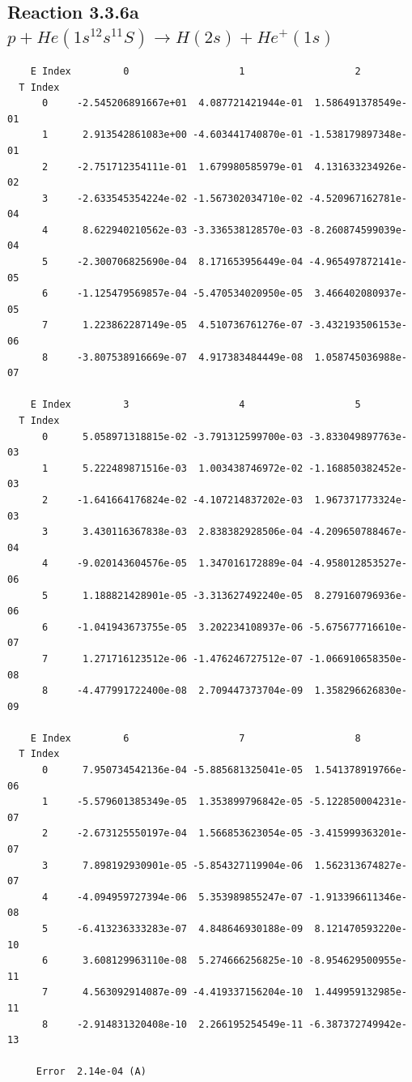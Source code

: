\documentclass[12pt,dvipdfmx]{article}
\begin{document}
\newpage
\subsection{
Reaction 3.3.6a $  p + He(1s^12s^11S) \rightarrow H(2s) + He^+(1s)$}


\begin{small}\begin{verbatim}
    E Index         0                   1                   2
  T Index
      0     -2.545206891667e+01  4.087721421944e-01  1.586491378549e-01
      1      2.913542861083e+00 -4.603441740870e-01 -1.538179897348e-01
      2     -2.751712354111e-01  1.679980585979e-01  4.131633234926e-02
      3     -2.633545354224e-02 -1.567302034710e-02 -4.520967162781e-04
      4      8.622940210562e-03 -3.336538128570e-03 -8.260874599039e-04
      5     -2.300706825690e-04  8.171653956449e-04 -4.965497872141e-05
      6     -1.125479569857e-04 -5.470534020950e-05  3.466402080937e-05
      7      1.223862287149e-05  4.510736761276e-07 -3.432193506153e-06
      8     -3.807538916669e-07  4.917383484449e-08  1.058745036988e-07

    E Index         3                   4                   5
  T Index
      0      5.058971318815e-02 -3.791312599700e-03 -3.833049897763e-03
      1      5.222489871516e-03  1.003438746972e-02 -1.168850382452e-03
      2     -1.641664176824e-02 -4.107214837202e-03  1.967371773324e-03
      3      3.430116367838e-03  2.838382928506e-04 -4.209650788467e-04
      4     -9.020143604576e-05  1.347016172889e-04 -4.958012853527e-06
      5      1.188821428901e-05 -3.313627492240e-05  8.279160796936e-06
      6     -1.041943673755e-05  3.202234108937e-06 -5.675677716610e-07
      7      1.271716123512e-06 -1.476246727512e-07 -1.066910658350e-08
      8     -4.477991722400e-08  2.709447373704e-09  1.358296626830e-09

    E Index         6                   7                   8
  T Index
      0      7.950734542136e-04 -5.885681325041e-05  1.541378919766e-06
      1     -5.579601385349e-05  1.353899796842e-05 -5.122850004231e-07
      2     -2.673125550197e-04  1.566853623054e-05 -3.415999363201e-07
      3      7.898192930901e-05 -5.854327119904e-06  1.562313674827e-07
      4     -4.094959727394e-06  5.353989855247e-07 -1.913396611346e-08
      5     -6.413236333283e-07  4.848646930188e-09  8.121470593220e-10
      6      3.608129963110e-08  5.274666256825e-10 -8.954629500955e-11
      7      4.563092914087e-09 -4.419337156204e-10  1.449959132985e-11
      8     -2.914831320408e-10  2.266195254549e-11 -6.387372749942e-13

     Error  2.14e-04 (A)
\end{verbatim}\end{small}
\end{document}

